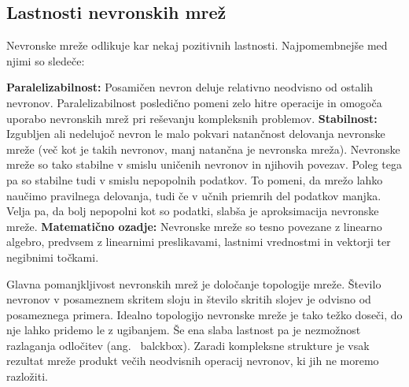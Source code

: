 \documentclass[mat1]{fmfdelo}
\begin{document}
\subsection{Lastnosti nevronskih mrež}
Nevronske mreže odlikuje kar nekaj pozitivnih lastnosti. Najpomembnejše med njimi so sledeče:

\textbf{Paralelizabilnost: }Posamičen nevron deluje relativno neodvisno od ostalih nevronov. Paralelizabilnost posledično pomeni zelo hitre operacije in omogoča uporabo nevronskih mrež pri reševanju kompleksnih problemov.
%
\textbf{Stabilnost: }Izgubljen ali nedelujoč nevron le malo pokvari natančnost delovanja nevronske mreže (več kot je takih nevronov, manj natančna je nevronska mreža). Nevronske mreže so tako stabilne v smislu uničenih nevronov in njihovih povezav. Poleg tega pa so stabilne tudi v smislu nepopolnih podatkov. To pomeni, da mrežo lahko naučimo pravilnega delovanja, tudi če v učnih priemrih del podatkov manjka. Velja pa, da bolj nepopolni kot so podatki, slabša je aproksimacija nevronske mreže.
%
\textbf{Matematično ozadje: }Nevronske mreže so tesno povezane z linearno algebro, predvsem z linearnimi preslikavami, lastnimi vrednostmi in vektorji ter negibnimi točkami.

Glavna pomanjkljivost nevronskih mrež je določanje topologije mreže. Število nevronov v posameznem skritem sloju in število skritih slojev je odvisno od posameznega primera. Idealno topologijo nevronske mreže je tako težko doseči, do nje lahko pridemo le z ugibanjem. Še ena slaba lastnost pa je nezmožnost razlaganja odločitev (ang.~ balckbox). Zaradi kompleksne strukture je vsak rezultat mreže produkt večih neodvisnih operacij nevronov, ki jih ne moremo razložiti.
%
%
\end{document}
